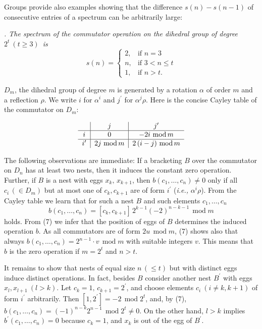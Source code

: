 \documentclass[a4paper,reqno]{amsart}\usepackage{amssymb,latexsym}
\theoremstyle{definition}
\theoremstyle{remark}
\numberwithin{equation}{section}
\numberwithin{theorem}{section}
\begin{document}
\smallskip

Groups provide also examples showing that the difference $s(n)-s(n-1)$ of
consecutive entries of a spectrum can be arbitrarily large:

\bigskip

\textit{. The spectrum of the commutator operation on the dihedral
group of degree }$2^{t}~(t\geq3)$\textit{\ is}\[
s(n)=\begin{cases}
2, & \text{if }n=3\\
n, & \text{if }3<n\leq t\\
1, & \text{if }n>t.
\end{cases}
\]

$D_{m}$, the dihedral group of degree $m$ is generated by a rotation $\alpha$
of order $m$ and a reflection $\rho$. We write $i$ for $\alpha^{i}$ and
$j^{\prime}$ for $\alpha^{j}\rho$. Here is the concise Cayley table of the
commutator on $D_{m}$:

\smallskip
\[
\setlength{\tabcolsep}{0.2cm}\begin{tabular}
[t]{c|c|c}
& $j$ & $j^{\prime}$\\\hline
$i$ & $0$ & $-2i\,\operatorname{mod}m$\\\hline
$i^{\prime}$ & $2j\,\operatorname{mod}m$ & $2\left(  i-j\right)
\,\operatorname{mod}m$\end{tabular}
\]

\bigskip

The following observations are immediate: If a bracketing $B$ over the
commutator on $D_{n}$ has at least two nests, then it induces the constant
zero operation. Further, if $B$ is a nest with eggs $x_{k},\,x_{k+1}$, then
$b(c_{1},\ldots,c_{n})\neq0$ only if all $c_{i}\,(\in D_{m})$ but at most one
of $c_{k},c_{k+1}$ are of form $i^{\prime}$ (\textit{i.e.,} $\alpha^{i}\rho$).
From the Cayley table we learn that for such a nest $B$ and such elements
$c_{1},\ldots,c_{n}$\begin{equation}
b(c_{1},\ldots,c_{n})=[c_{k},c_{k+1}]\,{2^{k-1}}(-2)^{n-k-1}\,\operatorname{mod}m \tag{7}\end{equation}
holds. From (7) we infer that the position of eggs of $B$ determines the
induced operation $b$. As all commutators are of form $2u\,\operatorname{mod}m$, (7) shows also that always $b(c_{1},\ldots,c_{n})={2^{n-1}}\cdot
v\,\operatorname{mod}m$ with suitable integers $v$. This means that $b$ is the
zero operation if $m=2^{t}$ and $n>t$.

It remains to show that nests of equal size $n\,(\leq t)$ but with distinct
eggs induce distinct operations. In fact, besides $B$ consider another nest
$B^{\prime}$ with eggs $x_{l},x_{l+1}~(l>k)$. Let $c_{k}=1,\,c_{k+1}=2^{\prime}$, and choose elements $c_{i}~(i\neq k,k+1)$ of form $i^{\prime}$
arbitrarily. Then $[1,2^{\prime}]=-2\,\operatorname{mod}2^{t}$, and, by (7),
$b(c_{1},\ldots,c_{n})=(-1)^{n-k}2^{n-1}\,\operatorname{mod}2^{t}\neq0$. On
the other hand, $l>k$ implies $b^{\prime}(c_{1},\ldots,c_{n})=0$ because
$c_{k}=1$, and $x_{k}$ is out of the egg of $B^{\prime}$.
\end{document}
